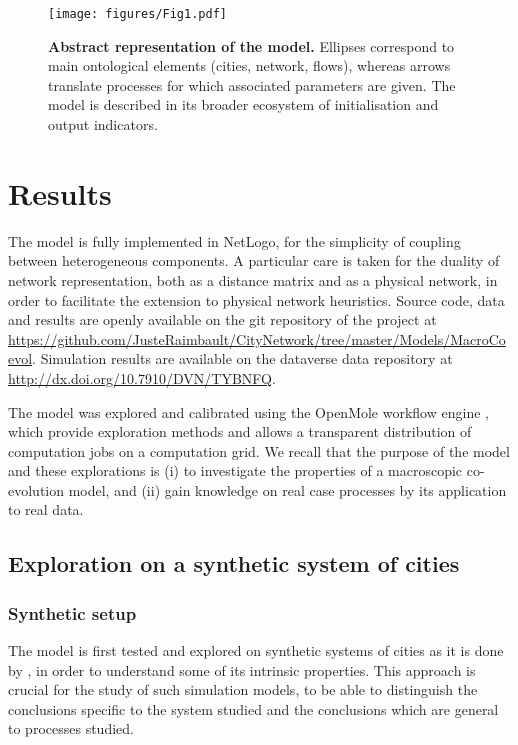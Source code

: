 \documentclass[11pt]{article}
\begin{document}
\begin{figure}
\texttt{[image: figures/Fig1.pdf]}
\caption{\textbf{Abstract representation of the model.} Ellipses correspond to main ontological elements (cities, network, flows), whereas arrows translate processes for which associated parameters are given. The model is described in its broader ecosystem of initialisation and output indicators.\label{fig:macrocoevol:model}}
\end{figure}



\section{Results}


The model is fully implemented in NetLogo, for the simplicity of coupling between heterogeneous components. A particular care is taken for the duality of network representation, both as a distance matrix and as a physical network, in order to facilitate the extension to physical network heuristics. Source code, data and results are openly available on the git repository of the project at \url{https://github.com/JusteRaimbault/CityNetwork/tree/master/Models/MacroCoevol}. Simulation results are available on the dataverse data repository at \url{http://dx.doi.org/10.7910/DVN/TYBNFQ}.

The model was explored and calibrated using the OpenMole workflow engine \citep{reuillon2013openmole}, which provide exploration methods and allows a transparent distribution of computation jobs on a computation grid. We recall that the purpose of the model and these explorations is (i) to investigate the properties of a macroscopic co-evolution model, and (ii) gain knowledge on real case processes by its application to real data.



\subsection{Exploration on a synthetic system of cities}

\subsubsection{Synthetic setup}

The model is first tested and explored on synthetic systems of cities as it is done by \cite{favaro2011gibrat}, in order to understand some of its intrinsic properties. This approach is crucial for the study of such simulation models, to be able to distinguish the conclusions specific to the system studied and the conclusions which are general to processes studied.
\end{document}

